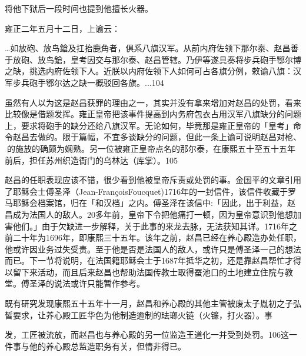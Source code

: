 \noindent 将他下狱后一段时间也提到他擅长火器。

雍正二年五月十二日，上谕云：

\begin{BookQuote}
…如放砲、放鸟鎗及扛抬鹿角者，俱系八旗汉军。从前内府佐领下那尔泰、赵昌善于放砲、放鸟鎗，皇考因交与那尔泰、赵昌管辖。乃伊等遂具奏将步兵砲手鄂尔博之缺，挑选内府佐领下人。近朕以内府佐领下人如何可占各旗分例，敕谕八旗：汉军步兵砲手鄂尔达之缺一概驳回各旗。...104
\end{BookQuote}

虽然有人以为这是赵昌获罪的理由之一，其实并没有拿来增加对赵昌的处罚，看来比较像是借题发挥。雍正皇帝把该事件提高到内务府包衣占用汉军八旗缺分的问题上，要求将砲手的缺分还给八旗汉军。无论如何，毕竟那是雍正皇帝的「皇考」命令赵昌去做的。限于篇幅，不宜多谈缺分的问题，但此一条上谕可说明赵昌对枪、𪿫的施放的确颇为娴熟。另一位被雍正皇帝点名的那尔泰，在康熙五十至五十五年前后，担任苏州织造衙门的乌林达（库掌）。105

赵昌的任职表现应该不错，很少看到他被皇帝斥责或处罚的事。金国平的文章引用了耶稣会士傅圣泽（Jean-FrançoisFoucquet)1716年的一封信件，该信件收藏于罗马耶稣会档案馆，归在「和汉档」之内。傅圣泽在该信中:「因此，出于利益，赵昌成为法国人的敌人。20多年前，皇帝下令把他痛打一顿，因为皇帝意识到他想加害他们。」由于欠缺进一步解释，关于此事的来龙去脉，无法获知其详。1716年之前二十年为1696年，即康熙三十五年。该年之前，赵昌已经在养心殿造办处任职，他或许因业务过失受责。至于他是否是法国人的敌人，或许只是傅圣泽一己的想法而已。下一节将说明，在法国籍耶稣会士于1687年抵华之初，还是靠赵昌帮忙才得以留下来活动，而且后来赵昌也帮助法国传教士取得蚕池口的土地建立住院与教堂。傅圣泽的说法或许只能暂作参考。

既有研究发现康熙五十五年十一月，赵昌和养心殿的其他主管被废太子胤初之子弘皙要求，让养心殿工匠华色为他制造逾制的珐瑯火链（火镰，打火器）。事

\vfill
\begin{BookNotes}
\end{BookNotes}

\noindent 发，工匠被流放，而赵昌也与养心殿的另一位监造王道化一并受到处罚。106这一件事与他的养心殿总监造职务有关，但情非得已。

